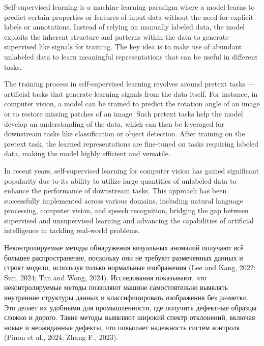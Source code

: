 \documentclass[14pt,a4paper]{article}
\begin{document}
Self-supervised learning is a machine learning paradigm where a model learns to predict certain properties or features of input data without the need for explicit labels or annotations. Instead of relying on manually labeled data, the model exploits the inherent structure and patterns within the data to generate supervised like signals for training. The key idea is to make use of abundant unlabeled data to learn meaningful representations that can be useful in different tasks. 

The training process in self-supervised learning revolves around pretext tasks — artificial tasks that generate learning signals from the data itself. For instance, in computer vision, a model can be trained to predict the rotation angle of an image or to restore missing patches of an image. Such pretext tasks help the model develop an understanding of the data, which can then be leveraged for downstream tasks like classification or object detection. After training on the pretext task, the learned representations are fine-tuned on tasks requiring labeled data, making the model highly efficient and versatile.

In recent years, self-supervised learning for computer vision has gained significant popularity due to its ability to utilize large quantities of unlabeled data to enhance the performance of downstream tasks. This approach has been successfully implemented across various domains, including natural language processing, computer vision, and speech recognition, bridging the gap between supervised and unsupervised learning and advancing the capabilities of artificial intelligence in tackling real-world problems. \cite{MasteringCompVis}

Неконтролируемые методы обнаружения визуальных аномалий получают всё большее распространение, поскольку они не требуют размеченных данных и строят модели, используя только нормальные изображения (Lee and Kang, 2022; Sun, 2024; Tan and Wong, 2024). Исследования показывают, что неконтролируемые методы позволяют машине самостоятельно выявлять внутренние структуры данных и классифицировать изображения без разметки. Это делает их удобными для промышленности, где получить дефектные образцы сложно и дорого. Такие методы выявляют широкий спектр отклонений, включая новые и неожиданные дефекты, что повышает надежность систем контроля (Pinon et al., 2024; Zhang F., 2023).
\end{document}
